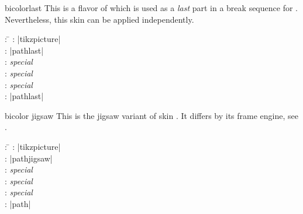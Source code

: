 \begin{dispExample}
\end{dispExample}


\clearpage
\begin{docSkin}{bicolorlast}
This is a flavor of  which is used as a \emph{last} part
in a break sequence for .
Nevertheless, this skin can be applied independently.
\begin{tcolorbox}[skintable=bicolorlast]
  \begin{tabbing}
    : \=\kill
    :  \> |tikzpicture|\\ 
    :           \> |pathlast|\\
    : \> \emph{special}\\ 
    :        \> \emph{special}\\
    :    \> \emph{special}\\
    :           \> |pathlast|
  \end{tabbing}
\end{tcolorbox}
\end{docSkin}


\begin{dispExample}
\end{dispExample}


\clearpage

\begin{docSkin}[doc new=2021-05-21]{bicolor jigsaw}
  This is the jigsaw variant of skin .
  It differs by its frame engine, see .
\begin{tcolorbox}[skintable=bicolor jigsaw]
  \begin{tabbing}
    : \=\kill
    :  \> |tikzpicture|\\ 
    :           \> |pathjigsaw|\\
    : \> \emph{special}\\ 
    :        \> \emph{special}\\
    :    \> \emph{special}\\
    :           \> |path|
  \end{tabbing}
\end{tcolorbox}
\end{docSkin}

